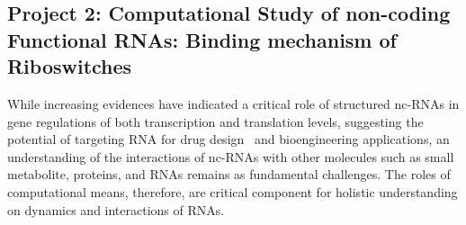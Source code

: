 \documentclass[a4paper,10pt]{article}
\begin{document}
\subsection*{Project 2: Computational Study of non-coding Functional RNAs: Binding mechanism of Riboswitches}


While increasing evidences have indicated a critical role of structured nc-RNAs in gene regulations of both transcription and translation levels, suggesting the potential of targeting RNA for drug
design~\cite{foloppe} and bioengineering applications, an understanding of the interactions of nc-RNAs with other molecules such as small metabolite, proteins, and RNAs remains as fundamental challenges.  The roles of computational means, therefore, are critical component for holistic understanding on dynamics and interactions of RNAs.  
\end{document}

